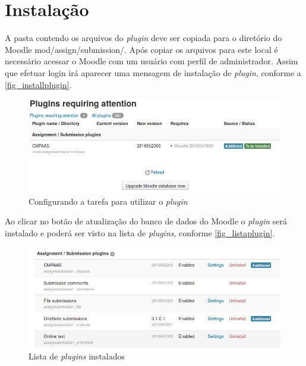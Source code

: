 \documentclass[
	12pt,				%
	openright,			%
	oneside,			%
	a4paper,			%
	english,			%
	french,				%
	spanish,			%
	brazil				%
	]{abntex2}
\begin{document}
\section{Instalação}
A pasta contendo os arquivos do \textit{plugin} deve ser copiada para o diretório do Moodle mod/assign/submission/. Após copiar os arquivos para este local é necessário acessar o Moodle com um usuário com perfil de administrador. Assim que efetuar login irá aparecer uma mensagem de instalação de \textit{plugin}, conforme a \autoref{fig_installplugin}.
\begin{figure}[htb]
	\caption{\label{fig_installplugin} Configurando a tarefa para utilizar o \textit{plugin}}
	\begin{center}
		\includegraphics[scale=0.4]{installplugin.png}
	\end{center}
\end{figure}

Ao clicar no botão de atualização do banco de dados do Moodle o \textit{plugin} será instalado e poderá ser visto na lista de \textit{plugins}, conforme \autoref{fig_listaplugin}.

\begin{figure}[htb]
	\caption{\label{fig_listaplugin} Lista de \textit{plugins} instalados}
	\begin{center}
		\includegraphics[scale=0.4]{listaplugin.png}
	\end{center}
\end{figure}
\end{document}
